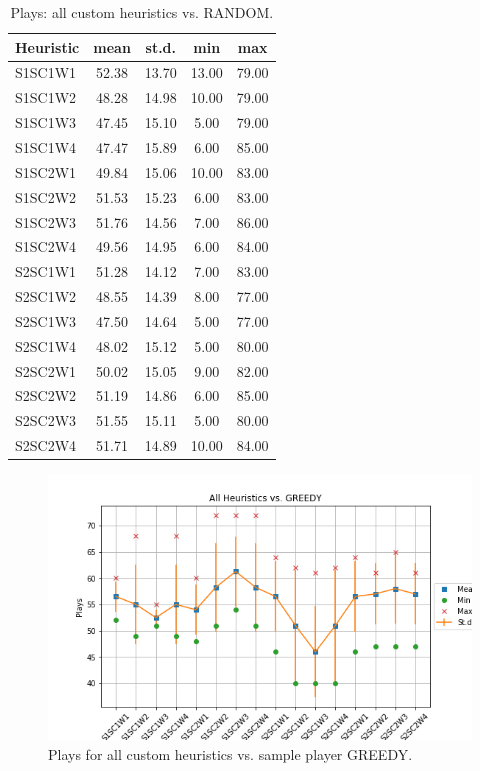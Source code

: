 \documentclass[a4paper]{article}
\begin{document}
    \begin{table}[htpb]
    \caption{ Plays: all custom heuristics vs. RANDOM.}
    \centering
    \begin{tabular}{ l | c c c c }
    Heuristic & mean & st.d. & min & max \\ \hline 
    S1SC1W1 & 52.38 & 13.70 & 13.00 & 79.00 \\
    S1SC1W2 & 48.28 & 14.98 & 10.00 & 79.00 \\
    S1SC1W3 & 47.45 & 15.10 & 5.00 & 79.00 \\
    S1SC1W4 & 47.47 & 15.89 & 6.00 & 85.00 \\
    S1SC2W1 & 49.84 & 15.06 & 10.00 & 83.00 \\
    S1SC2W2 & 51.53 & 15.23 & 6.00 & 83.00 \\
    S1SC2W3 & 51.76 & 14.56 & 7.00 & 86.00 \\
    S1SC2W4 & 49.56 & 14.95 & 6.00 & 84.00 \\
    S2SC1W1 & 51.28 & 14.12 & 7.00 & 83.00 \\
    S2SC1W2 & 48.55 & 14.39 & 8.00 & 77.00 \\
    S2SC1W3 & 47.50 & 14.64 & 5.00 & 77.00 \\
    S2SC1W4 & 48.02 & 15.12 & 5.00 & 80.00 \\
    S2SC2W1 & 50.02 & 15.05 & 9.00 & 82.00 \\
    S2SC2W2 & 51.19 & 14.86 & 6.00 & 85.00 \\
    S2SC2W3 & 51.55 & 15.11 & 5.00 & 80.00 \\
    S2SC2W4 & 51.71 & 14.89 & 10.00 & 84.00 
    \end{tabular}
    \label{tabplaysRANDOM}
    \end{table}

    


\begin{figure}[htpb]
\begin{center}
\includegraphics[width=1\columnwidth]{fig/results_Plays_All_vs_GREEDY.png}
\caption{Plays for all custom heuristics vs. sample player GREEDY.}
\end{center}
\label{figplyesGREEDY}
\end{figure}
    
\end{document}
